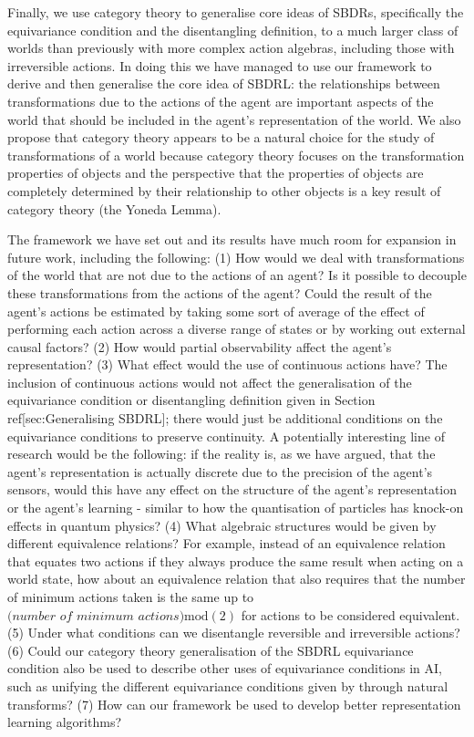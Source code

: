 Finally, we use category theory to generalise core ideas of SBDRs, specifically the equivariance condition and the disentangling definition, to a much larger class of worlds than previously with more complex action algebras, including those with irreversible actions.
In doing this we have managed to use our framework to derive and then generalise the core idea of SBDRL: the relationships between transformations due to the actions of the agent are important aspects of the world that should be included in the agent’s representation of the world.
We also propose that category theory appears to be a natural choice for the study of transformations of a world because category theory focuses on the transformation properties of objects and the perspective that the properties of objects are completely determined by their relationship to other objects is a key result of category theory (the Yoneda Lemma).

The framework we have set out and its results have much room for expansion in future work, including the following:
(1) How would we deal with transformations of the world that are not due to the actions of an agent?
Is it possible to decouple these transformations from the actions of the agent? Could the result of the agent's actions be estimated by taking some sort of average of the effect of performing each action across a diverse range of states or by working out external causal factors?
(2) How would partial observability affect the agent's representation?
(3) What effect would the use of continuous actions have?
The inclusion of continuous actions would not affect the generalisation of the equivariance condition or disentangling definition given in Section ref[sec:Generalising SBDRL]; there would just be additional conditions on the equivariance conditions to preserve continuity.
A potentially interesting line of research would be the following: if the reality is, as we have argued, that the agent’s representation is actually discrete due to the precision of the agent’s sensors, would this have any effect on the structure of the agent’s representation or the agent’s learning - similar to how the quantisation of particles has knock-on effects in quantum physics?
(4) What algebraic structures would be given by different equivalence relations?
For example, instead of an equivalence relation that equates two actions if they always produce the same result when acting on a world state, how about an equivalence relation that also requires that the number of minimum actions taken is the same up to $\textit{(number of minimum actions)} \text{mod} (2)$ for actions to be considered equivalent.
(5) Under what conditions can we disentangle reversible and irreversible actions?
(6) Could our category theory generalisation of the SBDRL equivariance condition also be used to describe other uses of equivariance conditions in AI, such as unifying the different equivariance conditions given by \autocite{Bronstein2021} through natural transforms?
(7) How can our framework be used to develop better representation learning algorithms?

